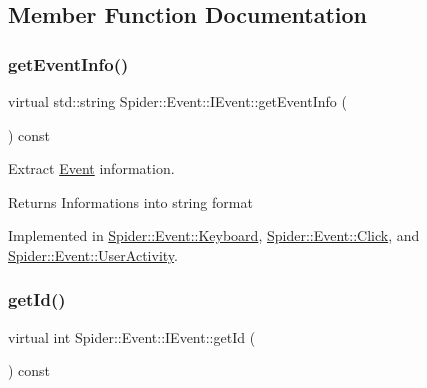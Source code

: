 \subsection{Member Function Documentation}
\mbox{\label{class_spider_1_1_event_1_1_i_event_ac8471df73080237faea55de539d968a0}} 
\subsubsection{\texorpdfstring{get\+Event\+Info()}{getEventInfo()}}
{\footnotesize\ttfamily virtual std\+::string Spider\+::\+Event\+::\+I\+Event\+::get\+Event\+Info (\begin{DoxyParamCaption}{ }\end{DoxyParamCaption}) const\hspace{0.3cm}{\ttfamily [pure virtual]}}



Extract \hyperlink{namespace_spider_1_1_event}{Event} information. 

\begin{DoxyReturn}{Returns}
Informations into string format 
\end{DoxyReturn}


Implemented in \hyperlink{class_spider_1_1_event_1_1_keyboard_a3ea8239e9f2002ea2a4eb5dd0bbbb55a}{Spider\+::\+Event\+::\+Keyboard}, \hyperlink{class_spider_1_1_event_1_1_click_a916e746dc2145859f697de4d9f64cd00}{Spider\+::\+Event\+::\+Click}, and \hyperlink{class_spider_1_1_event_1_1_user_activity_a72d2436a1d9b339cc1cb1950f374562f}{Spider\+::\+Event\+::\+User\+Activity}.

\mbox{\label{class_spider_1_1_event_1_1_i_event_a902d1376faa8e5948fa5bfe8d7208c88}} 
\subsubsection{\texorpdfstring{get\+Id()}{getId()}}
{\footnotesize\ttfamily virtual int Spider\+::\+Event\+::\+I\+Event\+::get\+Id (\begin{DoxyParamCaption}{ }\end{DoxyParamCaption}) const\hspace{0.3cm}{\ttfamily [pure virtual]}}



